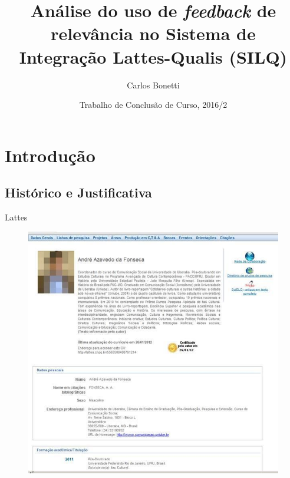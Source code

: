 \documentclass{beamer}
\title{Análise do uso de \textit{feedback} de relevância no Sistema de Integração Lattes-Qualis (SILQ)}
\author{Carlos Bonetti\inst{1}}
\institute[Universidade Federal de Santa Catarina] %
{
  \inst{1}%
  Bacharelando de Ciência da Computação\\
  Departamento de Informática e Estatística\\
  Centro Tecnológico\\
  Universidade Federal de Santa Catarina\\
  \hfill \\
  Orientação: Profª. Drª. Carina F. Dorneles
}
\date{Trabalho de Conclusão de Curso, 2016/2}
\begin{document}
\begin{frame}
  \titlepage
\end{frame}


\section{Introdução}

\subsection{Histórico e Justificativa}

\begin{frame}{Lattes}
  \begin{figure}
    \includegraphics[scale=0.3]{figuras/lattes.jpg}
  \end{figure}
\end{frame}
\end{document}

